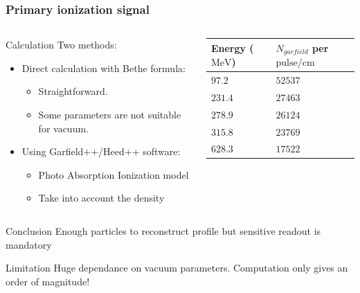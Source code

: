 \begin{frame}[t]
  \frametitle{Primary ionization signal}
  \begin{columns}
    \begin{column}{0.55\textwidth}
      \begin{block}{Calculation}
        Two methods:
        \begin{itemize}
          \item Direct calculation with Bethe formula:
                \begin{itemize}
                  \item Straightforward.
                  \item Some parameters are not suitable for vacuum.
                \end{itemize}
          \item Using Garfield++/Heed++ software:
                \begin{itemize}
                  \item Photo Absorption Ionization model
                  \item Take into account the density
                \end{itemize}
        \end{itemize}
      \end{block}
    \end{column}
    \begin{column}{0.35\textwidth}
      \begin{tabularx}{\linewidth}{XX}
        \toprule
        Energy ($\mathrm{MeV}$) & \(N_{garfield}\) per $\mathrm{pulse}/\mathrm{cm}$ \\
        \midrule
        \(97.2\)                & \(52537\)                                         \\
        \(231.4\)               & \(27463\)                                         \\
        \(278.9\)               & \(26124\)                                         \\
        \(315.8\)               & \(23769\)                                         \\
        \(628.3\)               & \(17522\)                                         \\
        \bottomrule
      \end{tabularx}
    \end{column}
  \end{columns}
  \begin{block}{Conclusion}
    Enough particles to reconstruct profile but sensitive readout is mandatory
  \end{block}
  \begin{alertblock}{Limitation}
    Huge dependance on vacuum parameters. Computation only gives an order of magnitude!
  \end{alertblock}
\end{frame}

